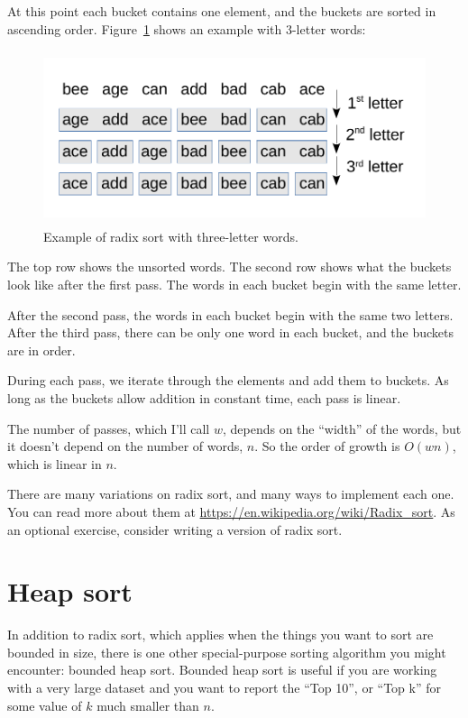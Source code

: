 \documentclass[12pt]{book}
\theoremstyle{exercise}
\begin{document}
At this point each bucket contains one element, and the buckets are
sorted in ascending order. Figure~\ref{fig-sort3}
shows an example with
3-letter words:

\begin{figure}
\centering
\includegraphics[height=2.0in]{figs/radix_sort1.pdf}
\caption{Example of radix sort with three-letter words.}
\label{fig-sort3}
\end{figure}

The top row shows the unsorted words. The second row shows what the
buckets look like after the first pass. The words in each bucket begin
with the same letter.

After the second pass, the words in each bucket begin with the same two
letters. After the third pass, there can be only one word in each
bucket, and the buckets are in order.

During each pass, we iterate through the elements and add them to
buckets. As long as the buckets allow addition in constant time, each
pass is linear.

The number of passes, which I'll call $w$, depends on the ``width''
of the words, but it doesn't depend on the number of words, $n$.
So the order of growth is $O(wn)$, which is linear in $n$.

There are many variations on radix sort, and many ways to implement
each one. You can read more about them at
\url{https://en.wikipedia.org/wiki/Radix_sort}. As an optional
exercise, consider writing a version of radix sort.


\section{Heap sort}
\label{heap-sort}

In addition to radix sort, which applies when the things you want to
sort are bounded in size, there is one other special-purpose sorting
algorithm you might encounter: bounded heap sort. Bounded heap sort is
useful if you are working with a very large dataset and you want to
report the ``Top 10'', or ``Top k'' for some value of $k$ much
smaller than $n$.
\end{document}
